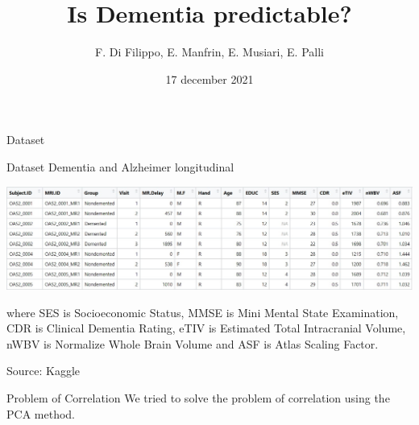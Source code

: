 \documentclass{beamer}
\title{{\LARGE Is Dementia predictable?}}
\author{F. Di Filippo, E. Manfrin, E. Musiari, E. Palli}
\date{17 december 2021}
\begin{document}
	
	\begin{frame}
		\maketitle
	\end{frame}
	
	
	\begin{frame}{Dataset}
		
		Dataset Dementia and Alzheimer longitudinal
		\begin{center}
			
			
			\includegraphics[width=\columnwidth]{dataset_al.jpeg}
		\end{center}
		
		
		where SES is Socioeconomic Status, MMSE is Mini Mental State Examination, CDR is Clinical Dementia Rating, eTIV is Estimated Total Intracranial Volume, nWBV is Normalize Whole Brain Volume and ASF is Atlas Scaling Factor.
		
		\vspace{0.1 cm}
		Source: Kaggle
		
		
	\end{frame}
	
	\begin{frame}{Problem of Correlation}
		We tried to solve the problem of correlation using the PCA method.
		
	\end{frame}
	
\end{document}
